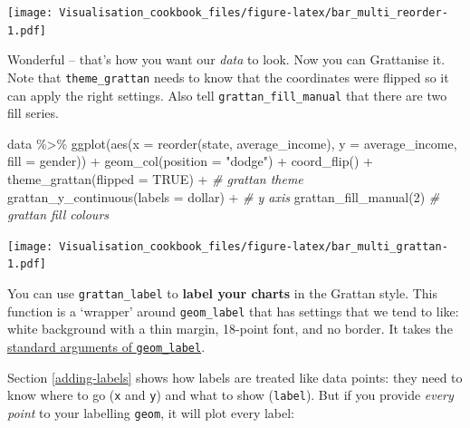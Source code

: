 \documentclass[
]{book}
\newenvironment{Shaded}{\begin{snugshade}}{\end{snugshade}}
\newcommand{\AttributeTok}[1]{\textcolor[rgb]{0.77,0.63,0.00}{#1}}
\newcommand{\CommentTok}[1]{\textcolor[rgb]{0.56,0.35,0.01}{\textit{#1}}}
\newcommand{\ConstantTok}[1]{\textcolor[rgb]{0.00,0.00,0.00}{#1}}
\newcommand{\DecValTok}[1]{\textcolor[rgb]{0.00,0.00,0.81}{#1}}
\newcommand{\FunctionTok}[1]{\textcolor[rgb]{0.00,0.00,0.00}{#1}}
\newcommand{\NormalTok}[1]{#1}
\newcommand{\SpecialCharTok}[1]{\textcolor[rgb]{0.00,0.00,0.00}{#1}}
\newcommand{\StringTok}[1]{\textcolor[rgb]{0.31,0.60,0.02}{#1}}
\begin{document}
\texttt{[image: Visualisation\_cookbook\_files/figure-latex/bar\_multi\_reorder-1.pdf]}

Wonderful -- that's how you want our \emph{data} to look. Now you can Grattanise it. Note that \texttt{theme\_grattan} needs to know that the coordinates were flipped so it can apply the right settings. Also tell \texttt{grattan\_fill\_manual} that there are two fill series.

\begin{Shaded}
\begin{Highlighting}[]
\NormalTok{data }\SpecialCharTok{\%\textgreater{}\%} 
  \FunctionTok{ggplot}\NormalTok{(}\FunctionTok{aes}\NormalTok{(}\AttributeTok{x =} \FunctionTok{reorder}\NormalTok{(state, average\_income), }
             \AttributeTok{y =}\NormalTok{ average\_income,}
             \AttributeTok{fill =}\NormalTok{ gender)) }\SpecialCharTok{+} 
  \FunctionTok{geom\_col}\NormalTok{(}\AttributeTok{position =} \StringTok{"dodge"}\NormalTok{) }\SpecialCharTok{+} 
  \FunctionTok{coord\_flip}\NormalTok{() }\SpecialCharTok{+} 
  \FunctionTok{theme\_grattan}\NormalTok{(}\AttributeTok{flipped =} \ConstantTok{TRUE}\NormalTok{) }\SpecialCharTok{+} \CommentTok{\# grattan theme}
  \FunctionTok{grattan\_y\_continuous}\NormalTok{(}\AttributeTok{labels =}\NormalTok{ dollar) }\SpecialCharTok{+} \CommentTok{\# y axis}
  \FunctionTok{grattan\_fill\_manual}\NormalTok{(}\DecValTok{2}\NormalTok{) }\CommentTok{\# grattan fill colours}
\end{Highlighting}
\end{Shaded}

\texttt{[image: Visualisation\_cookbook\_files/figure-latex/bar\_multi\_grattan-1.pdf]}

You can use \texttt{grattan\_label} to \textbf{label your charts} in the Grattan style. This function is a `wrapper' around \texttt{geom\_label} that has settings that we tend to like: white background with a thin margin, 18-point font, and no border. It takes the \href{https://ggplot2.tidyverse.org/reference/geom_text.html}{standard arguments of \texttt{geom\_label}}.

Section \ref{adding-labels} shows how labels are treated like data points: they need to know where to go (\texttt{x} and \texttt{y}) and what to show (\texttt{label}). But if you provide \emph{every point} to your labelling \texttt{geom}, it will plot every label:
\end{document}
